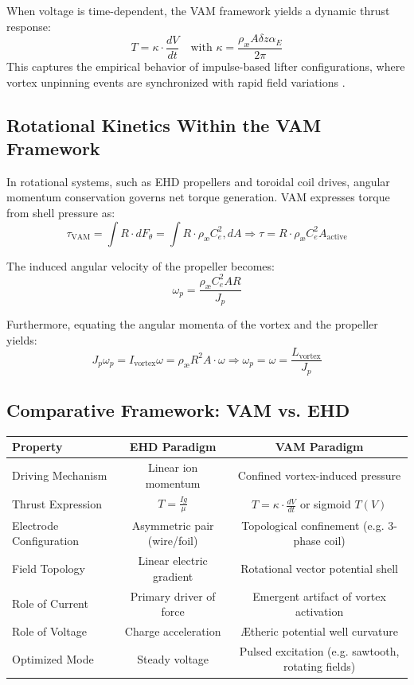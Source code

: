 When voltage is time-dependent, the VAM framework yields a dynamic thrust response:
\begin{equation}
\boxed{
T = \kappa \cdot \frac{dV}{dt}
\quad \text{with } \kappa = \frac{\rho_\text{\ae} A \delta z \alpha_E}{2\pi}
}
\end{equation}
This captures the empirical behavior of impulse-based lifter configurations, where vortex unpinning events are synchronized with rapid field variations \cite{vamthrustfit2025}.


\subsection{Rotational Kinetics Within the VAM Framework}
In rotational systems, such as EHD propellers and toroidal coil drives, angular momentum conservation governs net torque generation. VAM expresses torque from shell pressure as:
\begin{equation}
\tau_\text{VAM} = \int R \cdot dF_\theta = \int R \cdot \rho_\text{\ae} C_e^2 , dA \Rightarrow \tau = R \cdot \rho_\text{\ae} C_e^2 A_\text{active}
\end{equation}


The induced angular velocity of the propeller becomes:
\begin{equation}
\boxed{
\omega_p = \frac{\rho_\text{\ae} C_e^2 A R}{J_p}
}
\end{equation}


Furthermore, equating the angular momenta of the vortex and the propeller yields:
\begin{equation}
J_p \omega_p = I_\text{vortex} \omega = \rho_\text{\ae} R^2 A \cdot \omega
\Rightarrow \boxed{
\omega_p = \omega = \frac{L_\text{vortex}}{J_p}
}
\end{equation}


\subsection{Comparative Framework: VAM vs. EHD}
\begin{center}
\begin{tabular}{|l|c|c|}
\hline
\textbf{Property} & \textbf{EHD Paradigm} & \textbf{VAM Paradigm} \\
\hline
Driving Mechanism & Linear ion momentum & Confined vortex-induced pressure \\
Thrust Expression & $T = \frac{Ig}{\mu}$ & $T = \kappa \cdot \frac{dV}{dt}$ or sigmoid $T(V)$ \\
Electrode Configuration & Asymmetric pair (wire/foil) & Topological confinement (e.g. 3-phase coil) \\
Field Topology & Linear electric gradient & Rotational vector potential shell \\
Role of Current & Primary driver of force & Emergent artifact of vortex activation \\
Role of Voltage & Charge acceleration & Ætheric potential well curvature \\
Optimized Mode & Steady voltage & Pulsed excitation (e.g. sawtooth, rotating fields) \\
\hline
\end{tabular}
\end{center}
